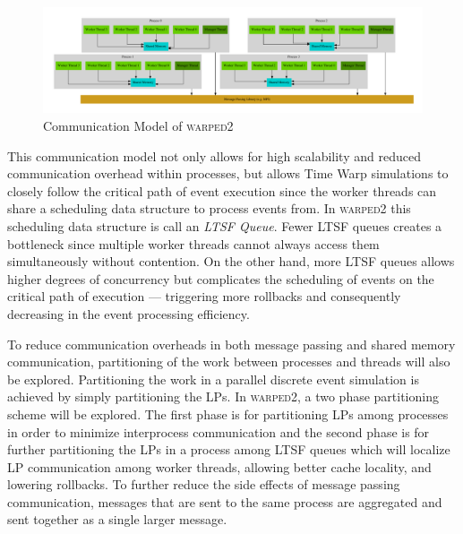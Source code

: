 \documentclass[11pt]{book}
\begin{document}
\begin{figure}
    \centering
    \includegraphics[width=\textwidth,quiet]{figs/graphviz/warped_communication.pdf}
    \caption{Communication Model of \textsc{warped2}}\label{warped2_communication}
\end{figure}

This communication model not only allows for high scalability and reduced communication overhead
within processes, but allows Time Warp simulations to closely follow the critical path of event
execution since the worker threads can share a scheduling data structure to process events from.  In
\textsc{warped2} this scheduling data structure is call an \emph{LTSF Queue}.  Fewer LTSF queues
creates a bottleneck since multiple worker threads cannot always access them simultaneously without
contention.  On the other hand, more LTSF queues allows higher degrees of concurrency but
complicates the scheduling of events on the critical path of execution --- triggering more rollbacks
and consequently decreasing in the event processing efficiency.

To reduce communication overheads in both message passing and shared memory communication,
partitioning of the work between processes and threads will also be explored.  Partitioning the work
in a parallel discrete event simulation is achieved by simply partitioning the LPs.  In
\textsc{warped2}, a two phase partitioning scheme will be explored.  The first phase is for
partitioning LPs among processes in order to minimize interprocess communication and the second phase
is for further partitioning the LPs in a process among LTSF queues which will localize LP
communication among worker threads, allowing better cache locality, and lowering rollbacks.  To
further reduce the side effects of message passing communication, messages that are sent to the same
process are aggregated and sent together as a single larger message.
\end{document}
